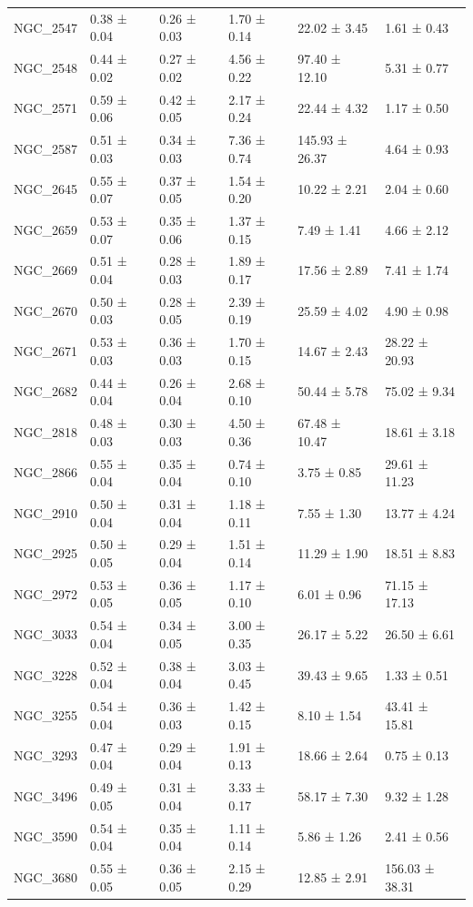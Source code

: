 \begin{tabular}{llllll}
NGC_2547 & 0.38 ± 0.04 & 0.26 ± 0.03 & 1.70 ± 0.14 & 22.02 ± 3.45 & 1.61 ± 0.43 \\
NGC_2548 & 0.44 ± 0.02 & 0.27 ± 0.02 & 4.56 ± 0.22 & 97.40 ± 12.10 & 5.31 ± 0.77 \\
NGC_2571 & 0.59 ± 0.06 & 0.42 ± 0.05 & 2.17 ± 0.24 & 22.44 ± 4.32 & 1.17 ± 0.50 \\
NGC_2587 & 0.51 ± 0.03 & 0.34 ± 0.03 & 7.36 ± 0.74 & 145.93 ± 26.37 & 4.64 ± 0.93 \\
NGC_2645 & 0.55 ± 0.07 & 0.37 ± 0.05 & 1.54 ± 0.20 & 10.22 ± 2.21 & 2.04 ± 0.60 \\
NGC_2659 & 0.53 ± 0.07 & 0.35 ± 0.06 & 1.37 ± 0.15 & 7.49 ± 1.41 & 4.66 ± 2.12 \\
NGC_2669 & 0.51 ± 0.04 & 0.28 ± 0.03 & 1.89 ± 0.17 & 17.56 ± 2.89 & 7.41 ± 1.74 \\
NGC_2670 & 0.50 ± 0.03 & 0.28 ± 0.05 & 2.39 ± 0.19 & 25.59 ± 4.02 & 4.90 ± 0.98 \\
NGC_2671 & 0.53 ± 0.03 & 0.36 ± 0.03 & 1.70 ± 0.15 & 14.67 ± 2.43 & 28.22 ± 20.93 \\
NGC_2682 & 0.44 ± 0.04 & 0.26 ± 0.04 & 2.68 ± 0.10 & 50.44 ± 5.78 & 75.02 ± 9.34 \\
NGC_2818 & 0.48 ± 0.03 & 0.30 ± 0.03 & 4.50 ± 0.36 & 67.48 ± 10.47 & 18.61 ± 3.18 \\
NGC_2866 & 0.55 ± 0.04 & 0.35 ± 0.04 & 0.74 ± 0.10 & 3.75 ± 0.85 & 29.61 ± 11.23 \\
NGC_2910 & 0.50 ± 0.04 & 0.31 ± 0.04 & 1.18 ± 0.11 & 7.55 ± 1.30 & 13.77 ± 4.24 \\
NGC_2925 & 0.50 ± 0.05 & 0.29 ± 0.04 & 1.51 ± 0.14 & 11.29 ± 1.90 & 18.51 ± 8.83 \\
NGC_2972 & 0.53 ± 0.05 & 0.36 ± 0.05 & 1.17 ± 0.10 & 6.01 ± 0.96 & 71.15 ± 17.13 \\
NGC_3033 & 0.54 ± 0.04 & 0.34 ± 0.05 & 3.00 ± 0.35 & 26.17 ± 5.22 & 26.50 ± 6.61 \\
NGC_3228 & 0.52 ± 0.04 & 0.38 ± 0.04 & 3.03 ± 0.45 & 39.43 ± 9.65 & 1.33 ± 0.51 \\
NGC_3255 & 0.54 ± 0.04 & 0.36 ± 0.03 & 1.42 ± 0.15 & 8.10 ± 1.54 & 43.41 ± 15.81 \\
NGC_3293 & 0.47 ± 0.04 & 0.29 ± 0.04 & 1.91 ± 0.13 & 18.66 ± 2.64 & 0.75 ± 0.13 \\
NGC_3496 & 0.49 ± 0.05 & 0.31 ± 0.04 & 3.33 ± 0.17 & 58.17 ± 7.30 & 9.32 ± 1.28 \\
NGC_3590 & 0.54 ± 0.04 & 0.35 ± 0.04 & 1.11 ± 0.14 & 5.86 ± 1.26 & 2.41 ± 0.56 \\
NGC_3680 & 0.55 ± 0.05 & 0.36 ± 0.05 & 2.15 ± 0.29 & 12.85 ± 2.91 & 156.03 ± 38.31 \\

\end{tabular}

